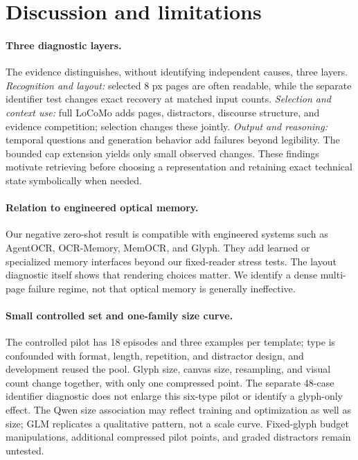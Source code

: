 \documentclass{article}
\begin{document}
\section{Discussion and limitations}

\paragraph{Three diagnostic layers.}
The evidence distinguishes, without identifying independent causes, three layers. \emph{Recognition and layout:} selected 8 px pages are often readable, while the separate identifier test changes exact recovery at matched input counts. \emph{Selection and context use:} full LoCoMo adds pages, distractors, discourse structure, and evidence competition; selection changes these jointly. \emph{Output and reasoning:} temporal questions and generation behavior add failures beyond legibility. The bounded cap extension yields only small observed changes. These findings motivate retrieving before choosing a representation and retaining exact technical state symbolically when needed.

\paragraph{Relation to engineered optical memory.}
Our negative zero-shot result is compatible with engineered systems such as AgentOCR, OCR-Memory, MemOCR, and Glyph. They add learned or specialized memory interfaces beyond our fixed-reader stress tests. The layout diagnostic itself shows that rendering choices matter. We identify a dense multi-page failure regime, not that optical memory is generally ineffective.

\paragraph{Small controlled set and one-family size curve.}
The controlled pilot has 18 episodes and three examples per template; type is confounded with format, length, repetition, and distractor design, and development reused the pool. Glyph size, canvas size, resampling, and visual count change together, with only one compressed point. The separate 48-case identifier diagnostic does not enlarge this six-type pilot or identify a glyph-only effect. The Qwen size association may reflect training and optimization as well as size; GLM replicates a qualitative pattern, not a scale curve. Fixed-glyph budget manipulations, additional compressed pilot points, and graded distractors remain untested.
\end{document}

